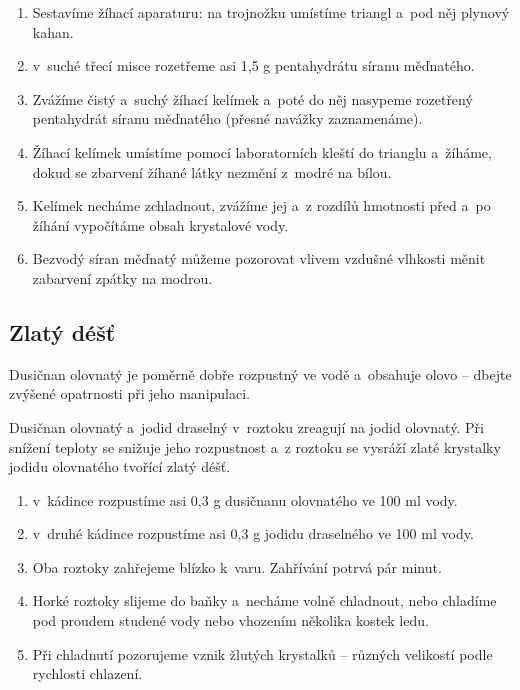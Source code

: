 \hspace{-21pt} 

\begin{enumerate}
  \item Sestavíme žíhací aparaturu: na trojnožku umístíme triangl a~pod něj plynový kahan.
  \item v~suché třecí misce rozetřeme asi 1,5 g pentahydrátu síranu měďnatého.
  \item Zvážíme čistý a~suchý žíhací kelímek a~poté do něj nasypeme rozetřený pentahydrát síranu měďnatého (přesné navážky zaznamenáme).
  \item Žíhací kelímek umístíme pomocí laboratorních kleští do trianglu a~žíháme, dokud se zbarvení žíhané látky nezmění z~modré na bílou.
  \item Kelímek necháme zchladnout, zvážíme jej a~z rozdílů hmotnosti před a~po žíhání vypočítáme obsah krystalové vody.
  \item Bezvodý síran měďnatý můžeme pozorovat vlivem vzdušné vlhkosti měnit zabarvení zpátky na modrou.
\end{enumerate}

\subsection{Zlatý déšť}


Dusičnan olovnatý je poměrně dobře rozpustný ve vodě a~obsahuje olovo -- dbejte zvýšené opatrnosti při jeho manipulaci.

\hspace{-21pt} 

Dusičnan olovnatý a~jodid draselný v~roztoku zreagují na jodid olovnatý. Při snížení teploty se snižuje jeho rozpustnost a~z roztoku se vysráží zlaté krystalky jodidu olovnatého tvořící zlatý déšť.

\hspace{-21pt} 

\begin{enumerate}
  \item v~kádince rozpustíme asi 0,3 g dusičnanu olovnatého ve 100 ml vody.
  \item v~druhé kádince rozpustíme asi 0,3 g jodidu draselného ve 100 ml vody.
  \item Oba roztoky zahřejeme blízko k~varu. Zahřívání potrvá pár minut.
  \item Horké roztoky slijeme do baňky a~necháme volně chladnout, nebo chladíme pod proudem studené vody nebo vhozením několika kostek ledu.
  \item Při chladnutí pozorujeme vznik žlutých krystalků -- různých velikostí podle rychlosti chlazení.
\end{enumerate}

